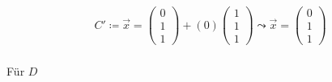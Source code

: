\begin{gather}
C'\coloneqq \vec{x} = \begin{pmatrix}
0\\1\\1
\end{pmatrix}+(0) \begin{pmatrix}
1\\1\\1
\end{pmatrix} 
\leadsto \vec{x} =
\begin{pmatrix}
0\\1\\1
\end{pmatrix}
\end{gather}\\

Für \ensuremath{D}  %

